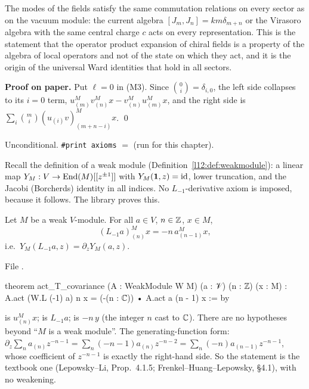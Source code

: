 \begin{physics}
The modes of the fields satisfy the same commutation relations on every sector as on the vacuum module: the
current algebra $[J_m,J_n] = km\delta_{m+n}$ or the Virasoro algebra with the same central charge $c$ acts on every
representation. This is the statement that the operator product expansion of chiral fields is a property of the algebra
of local operators and not of the state on which they act, and it is the origin of the universal Ward identities that
hold in all sectors.
\end{physics}

\textbf{Proof on paper.} Put $\ell = 0$ in (M3). Since $\binom0i = \delta_{i,0}$, the left side collapses to its $i=0$ term,
$u^M_{(m)}v^M_{(n)}x - v^M_{(n)}u^M_{(m)}x$, and the right side is $\sum_{i}\binom mi(u_{(i)}v)^M_{(m+n-i)}x$. \qed

\begin{status}
Unconditional. \texttt{\#print axioms}  $=$
\lean{[propext, Classical.}\allowbreak{}\allowbreak\lean{sound]} (run for this chapter).
\end{status}

Recall the definition of a weak module (Definition~\ref{l12:def:weakmodule}): a linear map
$Y_M:V\to\operatorname{End}(M)[[z^{\pm1}]]$ with $Y_M(\mathbf{1},z) = \mathrm{id}$, lower truncation, and the Jacobi
(Borcherds) identity in all indices. No $L_{-1}$-derivative axiom is imposed, because it follows. The
library proves this.

\begin{theorem}\label{l12:thm:covariance}
Let $M$ be a weak $V$-module. For all $a\in V$, $n\in{\mathbb{Z}}$, $x\in M$,
\begin{equation*}
 (L_{-1}a)^M_{(n)}x = -n\, a^M_{(n-1)}x ,
\end{equation*}
i.e.\ $Y_M(L_{-1}a,z) = \partial_z Y_M(a,z)$.
\end{theorem}
\noindent File .
\begin{leancode}
theorem act_T_covariance (A : WeakModule W M) (a : 𝒱) (n : ℤ) (x : M) :
    A.act (W.L (-1) a) n x = (-(n : ℂ)) • A.act a (n - 1) x := by
\end{leancode}

\begin{dictionary}
 is $u^M_{(n)}x$;  is $L_{-1}a$;  is $-n\,y$
(the integer $n$ cast to ${\mathbb{C}}$). There are no hypotheses beyond ``$M$ is a weak module''. The
generating-function form: $\partial_z\sum_n a_{(n)}z^{-n-1} = \sum_n(-n-1)a_{(n)}z^{-n-2}
= \sum_n (-n)a_{(n-1)}z^{-n-1}$, whose coefficient of $z^{-n-1}$ is exactly the right-hand side. So the
statement is the textbook one (Lepowsky--Li, Prop.~4.1.5; Frenkel--Huang--Lepowsky, §4.1), with no
weakening.
\end{dictionary}

